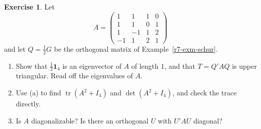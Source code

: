 \documentclass[12pt]{article}
\newcommand{\one}{\mathbf 1}
\DeclareMathOperator{\tr}{tr}
\theoremstyle{definition}
\newtheorem{exercise}{Exercise}
\begin{document}
\begin{exercise}\label{r7-ex-schur-drill}
Let
\[
A=\begin{pmatrix}1&1&1&0\\1&1&0&1\\1&-1&1&2\\-1&1&2&1\end{pmatrix}
\]
and let \(Q=\frac12G\) be the orthogonal matrix of Example~\ref{r7-exm-schur}.
\begin{enumerate}
\item Show that \(\frac12\one_4\) is an eigenvector of \(A\) of length \(1\), and that \(T=Q'AQ\) is upper triangular. Read
off the eigenvalues of \(A\).
\item Use (a) to find \(\tr(A^2+I_4)\) and \(\det(A^2+I_4)\), and check the trace directly.
\item Is \(A\) diagonalizable? Is there an orthogonal \(U\) with \(U'AU\) diagonal?
\end{enumerate}
\end{exercise}
\end{document}
